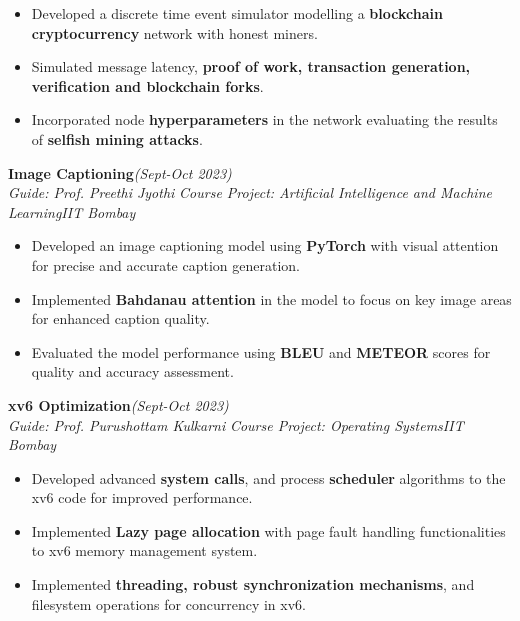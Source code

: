 \documentclass[10pt]{article}
\begin{document}
		\begin{itemize}[itemsep = -0.8 mm, leftmargin=*]
		\vspace{-16pt}
		\item  Developed a discrete time event simulator modelling a \textbf{blockchain cryptocurrency} network with honest miners.
		\item Simulated message latency, \textbf{proof of work, transaction generation, verification and blockchain forks}.
      \item Incorporated node \textbf{hyperparameters} in the network evaluating the results of \textbf{selfish mining attacks}.
	\end{itemize}
\vspace{-6pt}
{\selectfont
		\textbf{{Image Captioning}}\hfill{\sl \small (Sept-Oct 2023)}\\
	}{\it Guide: Prof. Preethi Jyothi \textbar} {\it Course Project: Artificial Intelligence and Machine Learning}\hfill{\sl \small IIT Bombay}\\
		\begin{itemize}[itemsep = -0.8 mm, leftmargin=*]
		\vspace{-16pt}
    \item Developed an image captioning model using \textbf{PyTorch} with visual attention for precise and accurate caption generation.
    
    \item Implemented \textbf{Bahdanau attention} in the model to focus on key image areas for enhanced caption quality.
    \item Evaluated the model performance using \textbf{BLEU} and \textbf{METEOR} scores for quality and accuracy assessment.
	\end{itemize}
 \vspace{-6pt}
{\selectfont
		\textbf{{xv6 Optimization}}\hfill{\sl \small (Sept-Oct 2023)}\\
	}{\it Guide: Prof. Purushottam Kulkarni \textbar} {\it Course Project: Operating Systems}\hfill{\sl \small IIT Bombay}\\
	\begin{itemize}[itemsep = -0.8 mm, leftmargin=*]
		\vspace{-16pt}
        \item Developed advanced \textbf{system calls}, and process \textbf{scheduler} algorithms to the xv6 code for improved performance.
        \item Implemented \textbf{Lazy page allocation} with page fault handling functionalities to xv6 memory management system.
        \item Implemented \textbf{threading, robust synchronization mechanisms}, and filesystem operations for concurrency in xv6.
	\end{itemize}
\end{document}
